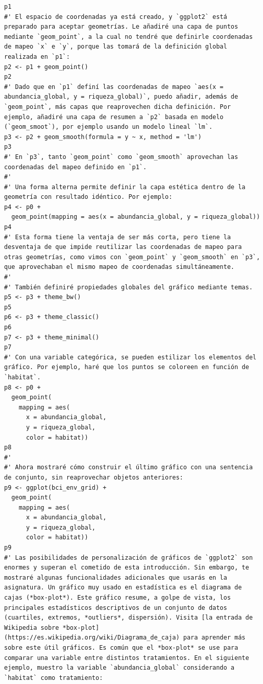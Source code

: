 \documentclass[11pt,]{article}
\begin{document}
\begin{verbatim}
p1
#' El espacio de coordenadas ya está creado, y `ggplot2` está preparado para aceptar geometrías. Le añadiré una capa de puntos mediante `geom_point`, a la cual no tendré que definirle coordenadas de mapeo `x` e `y`, porque las tomará de la definición global realizada en `p1`:
p2 <- p1 + geom_point()
p2
#' Dado que en `p1` definí las coordenadas de mapeo `aes(x = abundancia_global, y = riqueza_global)`, puedo añadir, además de `geom_point`, más capas que reaprovechen dicha definición. Por ejemplo, añadiré una capa de resumen a `p2` basada en modelo (`geom_smoot`), por ejemplo usando un modelo lineal `lm`.
p3 <- p2 + geom_smooth(formula = y ~ x, method = 'lm')
p3
#' En `p3`, tanto `geom_point` como `geom_smooth` aprovechan las coordenadas del mapeo definido en `p1`.
#' 
#' Una forma alterna permite definir la capa estética dentro de la geometría con resultado idéntico. Por ejemplo:
p4 <- p0 +
  geom_point(mapping = aes(x = abundancia_global, y = riqueza_global))
p4
#' Esta forma tiene la ventaja de ser más corta, pero tiene la desventaja de que impide reutilizar las coordenadas de mapeo para otras geometrías, como vimos con `geom_point` y `geom_smooth` en `p3`, que aprovechaban el mismo mapeo de coordenadas simultáneamente.
#' 
#' También definiré propiedades globales del gráfico mediante temas.
p5 <- p3 + theme_bw()
p5
p6 <- p3 + theme_classic()
p6
p7 <- p3 + theme_minimal()
p7
#' Con una variable categórica, se pueden estilizar los elementos del gráfico. Por ejemplo, haré que los puntos se coloreen en función de `habitat`.
p8 <- p0 +
  geom_point(
    mapping = aes(
      x = abundancia_global,
      y = riqueza_global,
      color = habitat))
p8
#' 
#' Ahora mostraré cómo construir el último gráfico con una sentencia de conjunto, sin reaprovechar objetos anteriores:
p9 <- ggplot(bci_env_grid) +
  geom_point(
    mapping = aes(
      x = abundancia_global,
      y = riqueza_global,
      color = habitat))
p9
#' Las posibilidades de personalización de gráficos de `ggplot2` son enormes y superan el cometido de esta introducción. Sin embargo, te mostraré algunas funcionalidades adicionales que usarás en la asignatura. Un gráfico muy usado en estadística es el diagrama de cajas (*box-plot*). Este gráfico resume, a golpe de vista, los principales estadísticos descriptivos de un conjunto de datos (cuartiles, extremos, *outliers*, dispersión). Visita [la entrada de Wikipedia sobre *box-plot](https://es.wikipedia.org/wiki/Diagrama_de_caja) para aprender más sobre este útil gráficos. Es común que el *box-plot* se use para comparar una variable entre distintos tratamientos. En el siguiente ejemplo, muestro la variable `abundancia_global` considerando a `habitat` como tratamiento:

\end{verbatim}
\end{document}
